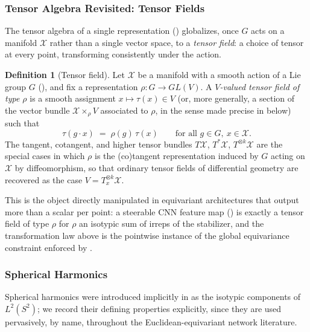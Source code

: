 \documentclass[11pt]{article}
\theoremstyle{plain}
\theoremstyle{definition}
\newtheorem{Definition}{Definition}[section]
\begin{document}
\subsubsection{Tensor Algebra Revisited: Tensor Fields}
\label{subsec:tensor-fields}

The tensor algebra of a single representation
() globalizes, once $G$ acts on a
manifold $\mathcal{X}$ rather than a single vector space, to a \emph{tensor field}: a
choice of tensor at every point, transforming consistently under the action.

\begin{Definition}[Tensor field]
\label{def:tensor-field}
Let $\mathcal{X}$ be a manifold with a smooth action of a Lie group $G$
(), and fix a representation
$\rho : G \to GL(V)$. A \emph{$V$-valued tensor field of type $\rho$} is a
smooth assignment $x \mapsto \tau(x) \in V$ (or, more generally, a section of
the vector bundle $\mathcal{X} \times_\rho V$ associated to $\rho$, in the sense made
precise in  below) such that
\[
    \tau(g \cdot x) \;=\; \rho(g)\, \tau(x) \qquad \text{for all } g \in G,\ x \in \mathcal{X}.
\]
The tangent, cotangent, and higher tensor bundles $T\mathcal{X}$, $T^*\mathcal{X}$,
$T^{\otimes k}\mathcal{X}$ are the special cases in which $\rho$ is the (co)tangent
representation induced by $G$ acting on $\mathcal{X}$ by diffeomorphism, so that
ordinary tensor fields of differential geometry are recovered as the case
$V = T_x^{\otimes k}\mathcal{X}$.
\end{Definition}

This is the object directly manipulated in equivariant architectures that
output more than a scalar per point: a steerable CNN feature map
() is exactly a tensor field of type
$\rho$ for $\rho$ an isotypic sum of irreps of the stabilizer, and the
transformation law above is the pointwise instance of the global
equivariance constraint enforced by .

\subsubsection{Spherical Harmonics}
\label{subsec:spherical-harmonics}

Spherical harmonics were introduced implicitly in
 as the isotypic components
of $L^2(S^2)$; we record their defining properties explicitly, since they
are used pervasively, by name, throughout the Euclidean-equivariant network
literature.
\end{document}
